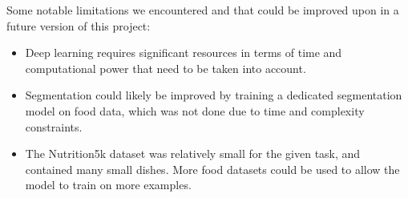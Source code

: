 \documentclass[a4paper]{article}
\begin{document}
    Some notable limitations we encountered and that could be improved upon in a future version of this project:

    \begin{itemize}
        \item Deep learning requires significant resources in terms of time and computational power that need to be taken into account.
        \item Segmentation could likely be improved by training a dedicated segmentation model on food data, which was not done due to time and complexity constraints.
        \item The Nutrition5k dataset was relatively small for the given task, and contained many small dishes. More food datasets could be used to allow the model to train on more examples.
    \end{itemize}


    
    
    
    
\end{document}
